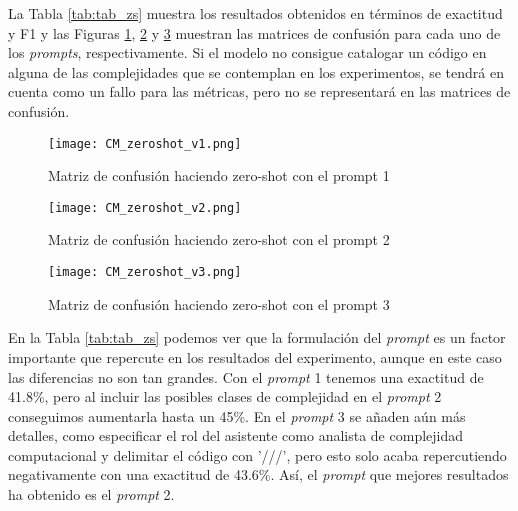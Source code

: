 \documentclass[12pt,twoside]{article}
\begin{document}
La Tabla \ref{tab:tab_zs} muestra los resultados obtenidos en términos de exactitud y F1 y las Figuras \ref{fig:confmat_zs1}, \ref{fig:confmat_zs2} y \ref{fig:confmat_zs3} muestran las matrices de confusión para cada uno de los \textit{prompts}, respectivamente. Si el modelo no consigue catalogar un código en alguna de las complejidades que se contemplan en los experimentos, se tendrá en cuenta como un fallo para las métricas, pero no se representará en las matrices de confusión.

\begin{table}[H]
    \centering
    \caption{Exactitud de la predicción de las clases de complejidad con zero-shot}
    \label{tab:tab_zs}
\end{table}

\begin{figure}[H]
  \centering
    \texttt{[image: CM\_zeroshot\_v1.png]}
  \caption{Matriz de confusión haciendo zero-shot con el prompt 1}
  \label{fig:confmat_zs1}
\end{figure}

\begin{figure}[H]
  \centering
    \texttt{[image: CM\_zeroshot\_v2.png]}
  \caption{Matriz de confusión haciendo zero-shot con el prompt 2}
  \label{fig:confmat_zs2}
\end{figure}

\begin{figure}[H]
  \centering
    \texttt{[image: CM\_zeroshot\_v3.png]}
  \caption{Matriz de confusión haciendo zero-shot con el prompt 3}
  \label{fig:confmat_zs3}
\end{figure}

En la Tabla \ref{tab:tab_zs} podemos ver que la formulación del \textit{prompt} es un factor importante que repercute en los resultados del experimento, aunque en este caso las diferencias no son tan grandes. Con el \textit{prompt} 1 tenemos una exactitud de 41.8\%, pero al incluir las posibles clases de complejidad en el \textit{prompt} 2 conseguimos aumentarla hasta un 45\%. En el \textit{prompt} 3 se añaden aún más detalles, como especificar el rol del asistente como analista de complejidad computacional y delimitar el código con '///', pero esto solo acaba repercutiendo negativamente con una exactitud de 43.6\%. Así, el \textit{prompt} que mejores resultados ha obtenido es el \textit{prompt} 2.
\end{document}
